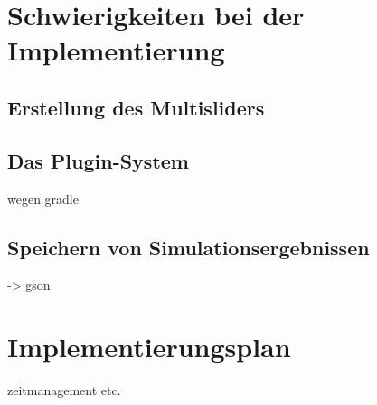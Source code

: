 \documentclass[parskip=full,11pt]{scrartcl}
\begin{document}
\section{Schwierigkeiten bei der Implementierung}

\subsection{Erstellung des Multisliders}

\subsection{Das Plugin-System}
wegen gradle

\subsection{Speichern von Simulationsergebnissen}
-> gson

\section{Implementierungsplan}
zeitmanagement etc.
\end{document}
